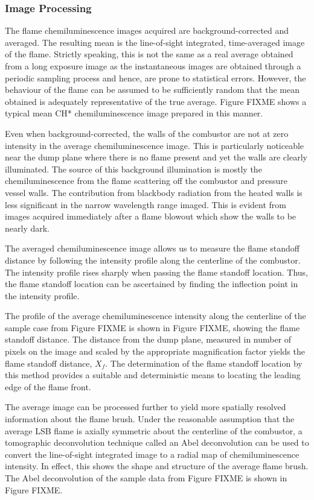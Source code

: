\subsubsection{Image Processing}

The flame chemiluminescence images acquired are background-corrected and averaged.
The resulting mean is the line-of-sight integrated, time-averaged image of the flame.
Strictly speaking, this is not the same as a real average obtained from a long exposure image as the instantaneous images are obtained through a periodic sampling process and hence, are prone to statistical errors.
However, the behaviour of the flame can be assumed to be sufficiently random that the mean obtained is adequately representative of the true average.
Figure FIXME shows a typical mean CH* chemiluminescence image prepared in this manner.

Even when background-corrected, the walls of the combustor are not at zero intensity in the average chemiluminescence image.
This is particularly noticeable near the dump plane where there is no flame present and yet the walls are clearly illuminated.
The source of this background illumination is mostly the chemiluminescence from the flame scattering off the combustor and pressure vessel walls.
The contribution from blackbody radiation from the heated walls is less significant in the narrow wavelength range imaged.
This is evident from images acquired immediately after a flame blowout which show the walls to be nearly dark.

The averaged chemiluminescence image allows us to measure the flame standoff distance by following the intensity profile along the centerline of the combustor.
The intensity profile rises sharply when passing the flame standoff location.
Thus, the flame standoff location can be ascertained by finding the inflection point in the intensity profile.

The profile of the average chemiluminescence intensity along the centerline of the sample case from Figure FIXME is shown in Figure FIXME, showing the flame standoff distance.
The distance from the dump plane, measured in number of pixels on the image and scaled by the appropriate magnification factor yields the flame standoff distance, \(X_f\).
The determination of the flame standoff location by this method provides a suitable and deterministic means to locating the leading edge of the flame front.

The average image can be processed further to yield more spatially resolved information about the flame brush.
Under the reasonable assumption that the average LSB flame is axially symmetric about the centerline of the combustor, a tomographic deconvolution technique called an Abel deconvolution\cite{1992-dasch} can be used to convert the line-of-sight integrated image to a radial map of chemiluminescence intensity.
In effect, this shows the shape and structure of the average flame brush.
The Abel deconvolution of the sample data from Figure FIXME is shown in Figure FIXME.

